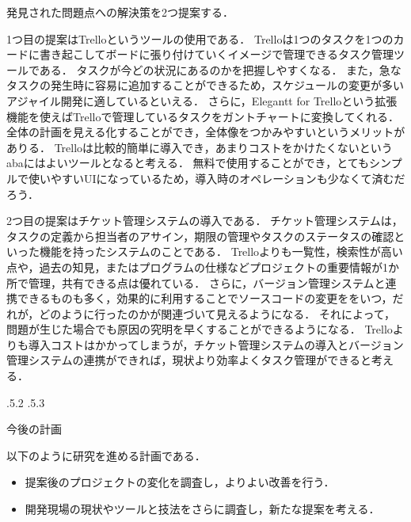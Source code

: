 \documentclass[uplatex]{jsarticle}
\makeatletter
\renewcommand{\section}{%
    \if@slide\clearpage\fi
    \@startsection{section}{1}{\z@}%
    {\Cvs \@plus.5\Cdp \@minus.2\Cdp}%
    {.5\Cvs \@plus.3\Cdp}%
    {\normalfont\raggedright}}
\makeatother
\begin{document}
発見された問題点への解決策を2つ提案する．

1つ目の提案はTrelloというツールの使用である．
Trelloは1つのタスクを1つのカードに書き起こしてボードに張り付けていくイメージで管理できるタスク管理ツールである．
タスクが今どの状況にあるのかを把握しやすくなる．
また，急なタスクの発生時に容易に追加することができるため，スケジュールの変更が多いアジャイル開発に適しているといえる．
さらに，Elegantt for Trelloという拡張機能を使えばTrelloで管理しているタスクをガントチャートに変換してくれる．
全体の計画を見える化することができ，全体像をつかみやすいというメリットがありる．
Trelloは比較的簡単に導入でき，あまりコストをかけたくないというabaにはよいツールとなると考える．
無料で使用することができ，とてもシンプルで使いやすいUIになっているため，導入時のオペレーションも少なくて済むだろう．

2つ目の提案はチケット管理システムの導入である\cite{ikeda2014}．
チケット管理システムは，タスクの定義から担当者のアサイン，期限の管理やタスクのステータスの確認といった機能を持ったシステムのことである．
Trelloよりも一覧性，検索性が高い点や，過去の知見，またはプログラムの仕様などプロジェクトの重要情報が1か所で管理，共有できる点は優れている．
さらに，バージョン管理システムと連携できるものも多く，効果的に利用することでソースコードの変更ををいつ，だれが，どのように行ったのかが関連づいて見えるようになる．
それによって，問題が生じた場合でも原因の究明を早くすることができるようになる．
Trelloよりも導入コストはかかってしまうが，チケット管理システムの導入とバージョン管理システムの連携ができれば，現状より効率よくタスク管理ができると考える．



\section{今後の計画}

以下のように研究を進める計画である．
\begin{itemize}
\item 提案後のプロジェクトの変化を調査し，よりよい改善を行う．
\item 開発現場の現状やツールと技法をさらに調査し，新たな提案を考える．
\end{itemize}



\end{document}
